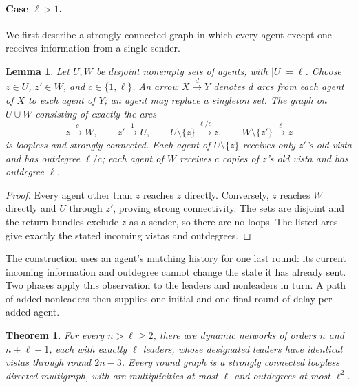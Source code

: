 \documentclass[11pt]{article}
\newtheorem{lemma}{Lemma}
\newtheorem{theorem}{Theorem}
\begin{document}
\paragraph{Case \(\ell>1\).}
We first describe a strongly connected graph in which every agent except
one receives information from a single sender.

\begin{lemma}\label{lem:two-center-graph}
Let \(U,W\) be disjoint nonempty sets of agents, with \(|U|=\ell\).
Choose \(z\in U\), \(z'\in W\), and \(c\in\{1,\ell\}\).
An arrow \(X\xrightarrow{d}Y\) denotes \(d\) arcs from each agent of \(X\)
to each agent of \(Y\); an agent may replace a singleton set.
The graph on \(U\cup W\) consisting of exactly the arcs
\[
 z\xrightarrow{c}W,\qquad
 z'\xrightarrow{1}U,\qquad
 U\setminus\{z\}\xrightarrow{\ell/c}z,\qquad
 W\setminus\{z'\}\xrightarrow{\ell}z
\]
is loopless and strongly connected.
Each agent of \(U\setminus\{z\}\) receives only \(z'\)'s old vista and has
outdegree \(\ell/c\); each agent of \(W\) receives \(c\) copies of \(z\)'s
old vista and has outdegree \(\ell\).
\end{lemma}

\begin{proof}
Every agent other than \(z\) reaches \(z\) directly. Conversely, \(z\)
reaches \(W\) directly and \(U\) through \(z'\), proving strong connectivity.
The sets are disjoint and the return bundles exclude \(z\) as a sender,
so there are no loops. The listed arcs give exactly the stated incoming
vistas and outdegrees.
\end{proof}

The construction uses an agent's matching history for one last round:
its current incoming information and outdegree cannot change the state it
has already sent. Two phases apply this observation to the leaders and
nonleaders in turn. A path of added nonleaders then supplies one initial
and one final round of delay per added agent.

\begin{theorem}
\label{thm:several-leader-vista}
For every \(n>\ell\ge2\), there are dynamic networks of orders \(n\) and
\(n+\ell-1\), each with exactly \(\ell\) leaders, whose designated leaders
have identical vistas through round \(2n-3\).
Every round graph is a strongly connected loopless directed multigraph,
with arc multiplicities at most \(\ell\) and outdegrees at most \(\ell^2\).
\end{theorem}
\end{document}
